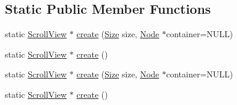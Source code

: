 \subsection*{Static Public Member Functions}
\begin{DoxyCompactItemize}
\item 
static \hyperlink{classScrollView}{Scroll\+View} $\ast$ \hyperlink{classScrollView_a1442b0e45ca34a346264d4eaaf3306a4}{create} (\hyperlink{classSize}{Size} size, \hyperlink{classNode}{Node} $\ast$container=N\+U\+LL)
\item 
static \hyperlink{classScrollView}{Scroll\+View} $\ast$ \hyperlink{classScrollView_a67c16969c9f515d00488fb58dd8318a3}{create} ()
\item 
static \hyperlink{classScrollView}{Scroll\+View} $\ast$ \hyperlink{classScrollView_adca37a2f6083dacfab480417e517e3d6}{create} (\hyperlink{classSize}{Size} size, \hyperlink{classNode}{Node} $\ast$container=N\+U\+LL)
\item 
static \hyperlink{classScrollView}{Scroll\+View} $\ast$ \hyperlink{classScrollView_ab688cda5af4913f7299b627ddb0eb6cb}{create} ()
\end{DoxyCompactItemize}

